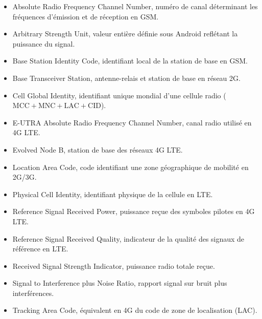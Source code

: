 \documentclass[11pt,a4paper]{article}
\begin{document}
\begin{itemize}[leftmargin=2.5cm, labelsep=0.5cm]
    \item[\textbf{ARFCN :}] Absolute Radio Frequency Channel Number, num\'ero de canal d\'eterminant les fr\'equences d'\'emission et de r\'eception en GSM.
    \item[\textbf{ASU :}] Arbitrary Strength Unit, valeur enti\`ere d\'efinie sous Android refl\'etant la puissance du signal.
    \item[\textbf{BSIC :}] Base Station Identity Code, identifiant local de la station de base en GSM.
    \item[\textbf{BTS :}] Base Transceiver Station, antenne-relais et station de base en r\'eseau 2G.
    \item[\textbf{CGI :}] Cell Global Identity, identifiant unique mondial d'une cellule radio ($\text{MCC}+\text{MNC}+\text{LAC}+\text{CID}$).
    \item[\textbf{EARFCN :}] E-UTRA Absolute Radio Frequency Channel Number, canal radio utilis\'e en 4G LTE.
    \item[\textbf{eNodeB :}] Evolved Node B, station de base des r\'eseaux 4G LTE.
    \item[\textbf{LAC :}] Location Area Code, code identifiant une zone g\'eographique de mobilit\'e en 2G/3G.
    \item[\textbf{PCI :}] Physical Cell Identity, identifiant physique de la cellule en LTE.
    \item[\textbf{RSRP :}] Reference Signal Received Power, puissance re\c{c}ue des symboles pilotes en 4G LTE.
    \item[\textbf{RSRQ :}] Reference Signal Received Quality, indicateur de la qualit\'e des signaux de r\'ef\'erence en LTE.
    \item[\textbf{RSSI :}] Received Signal Strength Indicator, puissance radio totale re\c{c}ue.
    \item[\textbf{SINR :}] Signal to Interference plus Noise Ratio, rapport signal sur bruit plus interf\'erences.
    \item[\textbf{TAC :}] Tracking Area Code, \'equivalent en 4G du code de zone de localisation (LAC).
\end{itemize}
\end{document}
